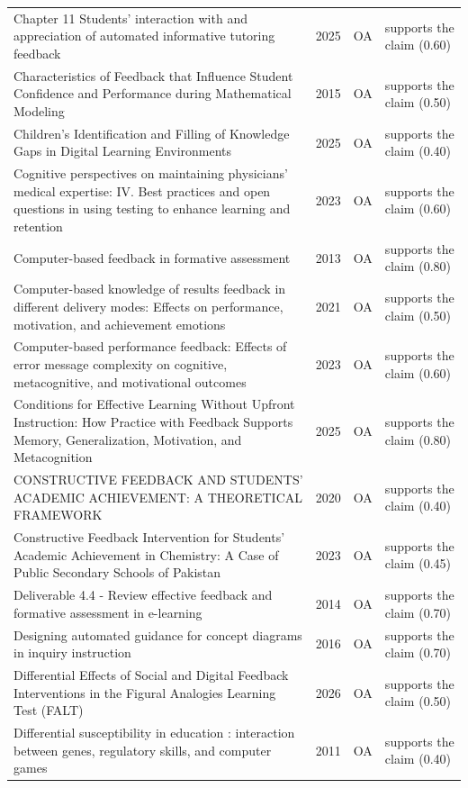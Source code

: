 \begin{longtable}{@{}%
  >{\raggedright\arraybackslash}p{}c%
  >{\raggedright\arraybackslash}p{}%
  >{\raggedright\arraybackslash}p{}@{}}
Chapter 11 Students' interaction with and appreciation of automated informative tutoring feedback & 2025 & OA & supports the claim (0.60) \\
Characteristics of Feedback that Influence Student Confidence and Performance during Mathematical Modeling & 2015 & OA & supports the claim (0.50) \\
Children's Identification and Filling of Knowledge Gaps in Digital Learning Environments & 2025 & OA & supports the claim (0.40) \\
Cognitive perspectives on maintaining physicians' medical expertise: IV. Best practices and open questions in using testing to enhance learning and retention & 2023 & OA & supports the claim (0.60) \\
Computer-based feedback in formative assessment & 2013 & OA & supports the claim (0.80) \\
Computer-based knowledge of results feedback in different delivery modes: Effects on performance, motivation, and achievement emotions & 2021 & OA & supports the claim (0.50) \\
Computer-based performance feedback: Effects of error message complexity on cognitive, metacognitive, and motivational outcomes & 2023 & OA & supports the claim (0.60) \\
Conditions for Effective Learning Without Upfront Instruction: How Practice with Feedback Supports Memory, Generalization, Motivation, and Metacognition & 2025 & OA & supports the claim (0.80) \\
CONSTRUCTIVE FEEDBACK AND STUDENTS' ACADEMIC ACHIEVEMENT: A THEORETICAL FRAMEWORK & 2020 & OA & supports the claim (0.40) \\
Constructive Feedback Intervention for Students' Academic Achievement in Chemistry: A Case of Public Secondary Schools of Pakistan & 2023 & OA & supports the claim (0.45) \\
Deliverable 4.4 - Review effective feedback and formative assessment in e-learning & 2014 & OA & supports the claim (0.70) \\
Designing automated guidance for concept diagrams in inquiry instruction & 2016 & OA & supports the claim (0.70) \\
Differential Effects of Social and Digital Feedback Interventions in the Figural Analogies Learning Test (FALT) & 2026 & OA & supports the claim (0.50) \\
Differential susceptibility in education : interaction between genes, regulatory skills, and computer games & 2011 & OA & supports the claim (0.40) \\

\end{longtable}
